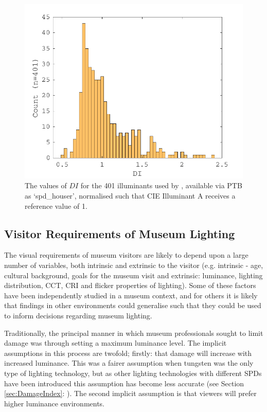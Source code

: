 \begin{figure}[htbp]
\includegraphics[max width=\textwidth]{figs/LitRev/DI.pdf}
\caption{The values of $DI$ for the 401 illuminants used by \citet{houser_review_2013}, available via \gls{PTB} as `spd\_houser', normalised such that \gls{CIE} Illuminant A receives a reference value of 1.}
\label{fig:Houser}
\end{figure}


\clearpage
\subsection{Visitor Requirements of Museum Lighting}

The visual requirements of museum visitors are likely to depend upon a large number of variables, both intrinsic and extrinsic to the visitor (e.g. intrinsic - age, cultural background, goals for the museum visit and extrinsic: luminance, lighting distribution, \gls{CCT}, \gls{CRI} and flicker properties of lighting). Some of these factors have been independently studied in a museum context, and for others it is likely that findings in other environments could generalise such that they could be used to inform decisions regarding museum lighting.

Traditionally, the principal manner in which museum professionals sought to limit damage was through setting a maximum luminance level. The implicit assumptions in this process are twofold; firstly: that damage will increase with increased luminance. This was a fairer assumption when tungsten was the only type of lighting technology, but as other lighting technologies with different \glspl{SPD} have been introduced this assumption has become less accurate (see Section \ref{sec:DamageIndex}: ). The second implicit assumption is that viewers will prefer higher luminance environments.

